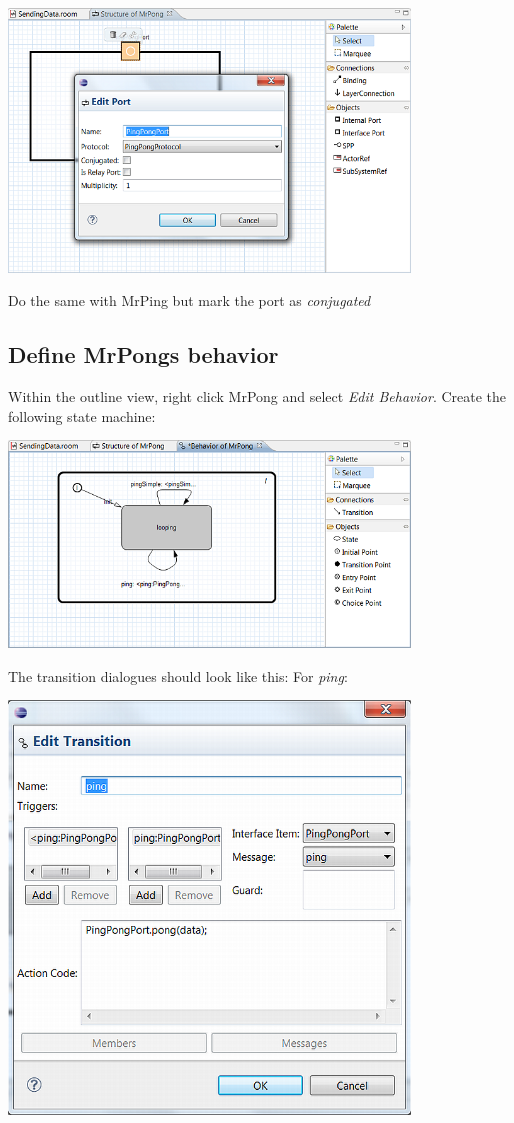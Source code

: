 \includegraphics[width=0.8\textwidth]{images/025-SendingData02.png}

Do the same with MrPing but mark the port as \textit{conjugated}

\subsection{Define MrPongs behavior}

Within the outline view, right click MrPong and select \textit{Edit Behavior}. Create the following state machine:

\includegraphics[width=0.8\textwidth]{images/025-SendingData04.png}

The transition dialogues should look like this:
For \textit{ping}:

\includegraphics[width=0.8\textwidth]{images/025-SendingData05.png}

